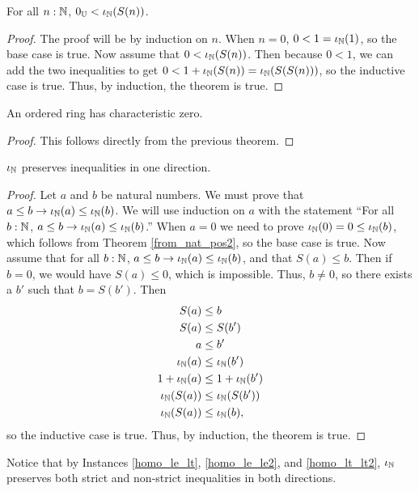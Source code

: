 \documentclass[../math.tex]{subfiles}
\begin{document}
\begin{theorem} \label{from_nat_pos}
    For all $n : \mathbb{N}$, $0_{\mathbb{U}} < \iota_{\mathbb{N}}(S(n))$.
\end{theorem}
\begin{proof}
    The proof will be by induction on $n$.  When $n = 0$, $0 < 1 = \iota_{\mathbb{N}}(1)$, so
    the base case is true.  Now assume that $0 < \iota_{\mathbb{N}}(S(n))$.  Then because $0 <
    1$, we can add the two inequalities to get $0 < 1 + \iota_{\mathbb{N}}(S(n)) =
    \iota_{\mathbb{N}}(S(S(n)))$, so the inductive case is true.  Thus, by induction, the
    theorem is true.
\end{proof}

\begin{instance}
    An ordered ring has characteristic zero.
\end{instance}
\begin{proof}
    This follows directly from the previous theorem.
\end{proof}

\begin{instance}
    $\iota_{\mathbb{N}}$ preserves inequalities in one direction.
\end{instance}
\begin{proof}
    Let $a$ and $b$ be natural numbers.  We must prove that $a \leq b
    \rightarrow \iota_{\mathbb{N}}(a) \leq \iota_{\mathbb{N}}(b)$.  We will use induction on $a$ with the
    statement ``For all $b : \mathbb{N}$, $a \leq b \rightarrow \iota_{\mathbb{N}}(a) \leq \iota_{\mathbb{N}}(b)$.''
    When $a = 0$ we need to prove $\iota_{\mathbb{N}}(0) = 0 \leq \iota_{\mathbb{N}}(b)$, which follows from
    Theorem \ref{from_nat_pos2}, so the base case is true.  Now assume that for
    all $b : \mathbb{N}$, $a \leq b \rightarrow \iota_{\mathbb{N}}(a) \leq \iota_{\mathbb{N}}(b)$, and that $S(a) \leq
    b$.  Then if $b = 0$, we would have $S(a) \leq 0$, which is impossible.
    Thus, $b \neq 0$, so there exists a $b'$ such that $b = S(b')$.  Then
    \begin{align*}
        S(a) &\leq b \\
        S(a) &\leq S(b') \\
        a &\leq b' \\
        \iota_{\mathbb{N}}(a) &\leq \iota_{\mathbb{N}}(b') \\
        1 + \iota_{\mathbb{N}}(a) &\leq 1 + \iota_{\mathbb{N}}(b') \\
        \iota_{\mathbb{N}}(S(a)) &\leq \iota_{\mathbb{N}}(S(b')) \\
        \iota_{\mathbb{N}}(S(a)) &\leq \iota_{\mathbb{N}}(b),
    \end{align*}
    so the inductive case is true.  Thus, by induction, the theorem is true.
\end{proof}

Notice that by Instances \ref{homo_le_lt}, \ref{homo_le_le2}, and
\ref{homo_lt_lt2}, $\iota_{\mathbb{N}}$ preserves both strict and non-strict inequalities in
both directions.
\end{document}
